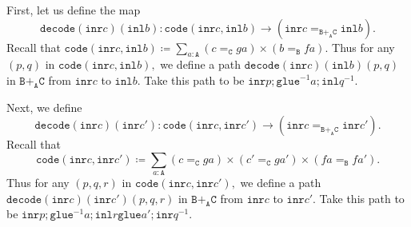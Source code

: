 \documentclass[12pt]{amsart}
\newcommand{\from}{\colon}
\newcommand{\inv}{^{-1}}
\newcommand{\bydef}{\coloneqq}
\newcommand{\type}[1]{\mathtt{#1}}
\newcommand{\tin}{\colon}
\newcommand{\A}{\type{A}}
\newcommand{\B}{\type{B}}
\newcommand{\C}{\type{C}}
\newcommand{\BAC}{\B +_{\A} \C}
\newcommand{\inl}{\type{inl}}
\newcommand{\inr}{\type{inr}}
\newcommand{\glue}{\type{glue}}
\newcommand{\code}{\type{code}}
\newcommand{\decode}{\type{decode}}
\theoremstyle{remark}
\theoremstyle{definition}
\begin{document}

First, let us define the map
\[
  \decode ( \inr c ) ( \inl b ) \from
    \code ( \inr c , \inl b ) \to
    ( \inr c =_{\BAC} \inl b ).
\]
Recall that
\(
  \code ( \inr c , \inl b ) \coloneqq
    \sum\limits_{a \tin \A}
    ( c =_{\C} ga ) \times ( b =_{\B} fa ).
\)
Thus for any \( ( p,q ) \) in
\(
  \code ( \inr c , \inl b ),
\)
we define a path
\(
  \decode ( \inr c ) ( \inl b ) ( p,q )
\)
in \( \BAC \) from \( \inr c \) to  \( \inl b \). Take this path to be
\(
  \inr p ; \glue^{-1}  a ; \inl q^{-1}.
\)


Next, we define
\[
  \decode ( \inr c ) ( \inr c' ) \from
  \code ( \inr c , \inr c' ) \to
  ( \inr c =_{\BAC} \inr c' ).
\]
Recall that
\[
  \code ( \inr c , \inr c' ) \bydef
  \sum\limits_{a \tin \A}
  ( c =_{\C} ga ) \times ( c' =_{\C} ga' ) \times ( fa =_{\B} fa' ). 
\]
Thus for any \( ( p,q,r ) \) in
\(
  \code ( \inr c , \inr c' ),
\)
we define a path
\(
  \decode ( \inr c ) ( \inr c' ) ( p,q,r )
\)
in \( \BAC \) from \( \inr c \) to \( \inr c' \). Take this path to be
\(
  \inr p ; \glue\inv a ; \inl r \glue a' ; \inr q\inv.
\)

\end{document}
